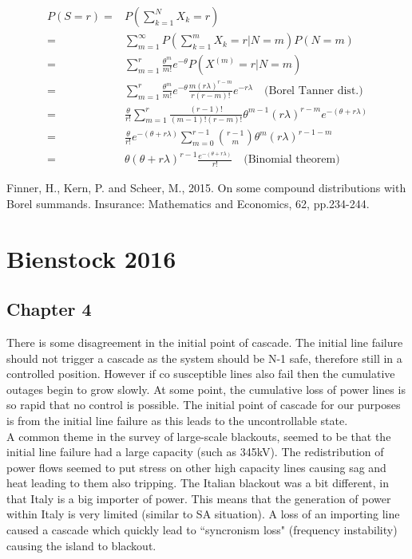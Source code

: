 \documentclass{article}
\begin{document}
\[\begin{aligned}
P(S=r) =& P\left( \sum_{k=1}^{N}  X_k=r \right)\\
=& \sum_{m=1}^{\infty} P\left(\sum_{k=1}^{m} X_k=r|N=m \right)P(N=m)\\
=& \sum_{m=1}^{r} \frac{\theta^m}{m!}e^{-\theta} P(X^{(m)} = r|N=m)\\
=& \sum_{m=1}^{r} \frac{\theta^m}{m!}e^{-\theta} \frac{m(r\lambda)^{r-m}}{r(r-m)!}e^{-r\lambda} \quad \text{(Borel Tanner dist.)}\\
=& \frac{\theta}{r!} \sum_{m=1}^{r} \frac{(r-1)!}{(m-1)!(r-m)!} \theta^{m-1}(r\lambda)^{r-m}e^{-(\theta+r\lambda)}\\
=& \frac{\theta}{r!}e^{-(\theta+r\lambda)} \sum_{m=0}^{r-1} {r-1\choose m} \theta^m (r\lambda)^{r-1-m}\\
=& \theta(\theta + r\lambda)^{r-1} \frac{e^{-(\theta+r\lambda)}}{r!} \quad \text{(Binomial theorem)}
\end{aligned}\]

Finner, H., Kern, P. and Scheer, M., 2015. On some compound distributions with Borel summands. Insurance: Mathematics and Economics, 62, pp.234-244.

\section{Bienstock 2016}
\subsection{Chapter 4}

There is some disagreement in the initial point of cascade. The initial line failure should not trigger a cascade as the system should be N-1 safe, therefore still in a controlled position. However if co susceptible lines also fail then the cumulative outages begin to grow slowly. At some point, the cumulative loss of power lines is so rapid that no control is possible. The initial point of cascade for our purposes is from the initial line failure as this leads to the uncontrollable state.\\

A common theme in the survey of large-scale blackouts, seemed to be that the initial line failure had a large capacity (such as 345kV). The redistribution of power flows seemed to put stress on other high capacity lines causing sag and heat leading to them also tripping. The Italian blackout was a bit different, in that Italy is a big importer of power. This means that the generation of power within Italy is very limited (similar to SA situation). A loss of an importing line caused a cascade which quickly lead to ``syncronism loss" (frequency instability) causing the island to blackout.\\
\end{document}
